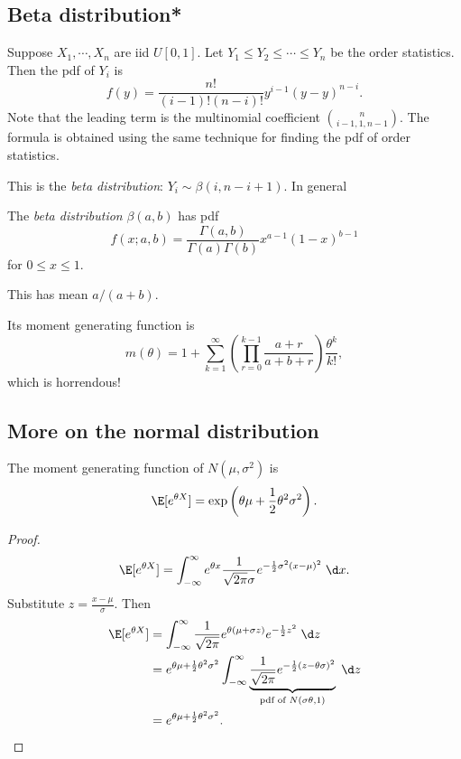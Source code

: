 \documentclass[a4paper]{article}
\begin{document}
\subsection{Beta distribution*}
Suppose $X_1, \cdots, X_n$ are iid $U[0, 1]$. Let $Y_1 \leq Y_2 \leq \cdots \leq Y_n$ be the order statistics. Then the pdf of $Y_i$ is
\[
  f(y) = \frac{n!}{(i - 1)!(n - i)!}y^{i - 1}(y - y)^{n - i}.
\]
Note that the leading term is the multinomial coefficient $\binom{n}{i - 1, 1, n - 1}$. The formula is obtained using the same technique for finding the pdf of order statistics.

This is the \emph{beta distribution}: $Y_i \sim \beta(i, n - i + 1)$. In general
\begin{defi}
  The \emph{beta distribution} $\beta(a, b)$ has pdf
  \[
    f(x; a, b) = \frac{\Gamma(a, b)}{\Gamma(a)\Gamma(b)}x^{a - 1}(1 - x)^{b - 1}
  \]
  for $0 \leq x \leq 1$.

  This has mean $a/(a + b)$.
\end{defi}
Its moment generating function is
\[
  m(\theta) = 1 + \sum_{k = 1}^\infty \left(\prod_{r = 0}^{k - 1}\frac{a + r}{a + b + r}\right)\frac{\theta^k}{k!},
\]
which is horrendous!

\subsection{More on the normal distribution}
\begin{prop}
  The moment generating function of $N(\mu, \sigma^2)$ is
  \[
    \E[e^{\theta X}] = \exp\left(\theta\mu + \frac{1}{2}\theta^2 \sigma^2\right).
  \]
\end{prop}

\begin{proof}
 \[
  \E[e^{\theta X}] = \int_{-\infty}^\infty e^{\theta x} \frac{1}{\sqrt{2\pi} \sigma} e^{-\frac{1}{2}\sigma^2 (x - \mu)^2}\;\d x.
\]
Substitute $z = \frac{x - \mu}{\sigma}$. Then
\begin{align*}
  \E[e^{\theta X}] &= \int_{-\infty}^\infty \frac{1}{\sqrt{2\pi}}e^{\theta(\mu + \sigma z)} e^{-\frac{1}{2}z^2}\;\d z\\
  &= e^{\theta\mu + \frac{1}{2}\theta^2\sigma^2}\int_{-\infty}^\infty \underbrace{\frac{1}{\sqrt{2\pi}}e^{-\frac{1}{2}(z - \theta \sigma)^2}}_{\text{pdf of }N(\sigma\theta, 1)}\;\d z\\
  &= e^{\theta\mu + \frac{1}{2}\theta^2\sigma^2}.
\end{align*}
\end{proof}
\end{document}
